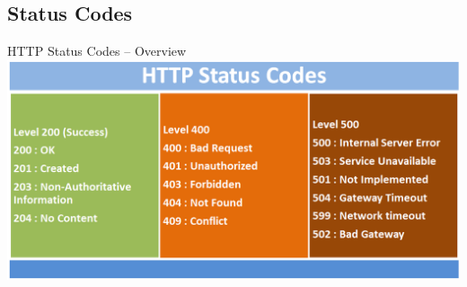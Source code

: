 \documentclass[presentation]{beamer}\mode<presentation>{\usetheme{AMSBolognaFC}}
\begin{document}
\subsection{Status Codes}

\begin{frame}{HTTP Status Codes -- Overview}
    \includegraphics[width=\linewidth]{figures/http_status_codes.png}
\end{frame}
\end{document}
